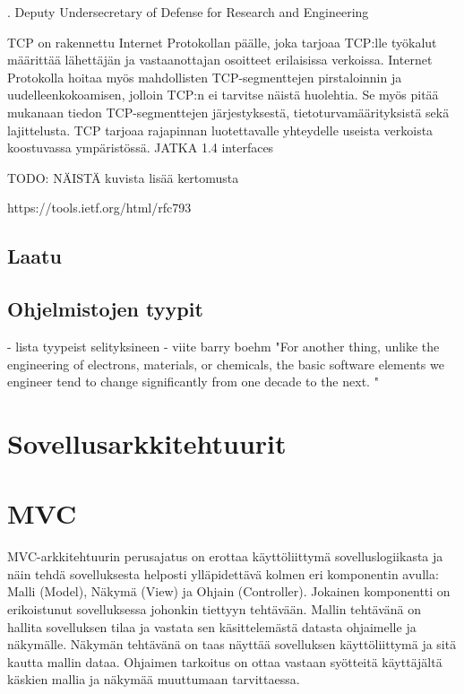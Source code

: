 \documentclass[utf8]{gradu3}
\begin{document}
  \cite{tcp}. 
  Deputy Undersecretary of Defense for Research and Engineering

TCP on rakennettu Internet Protokollan päälle, joka tarjoaa TCP:lle työkalut määrittää lähettäjän ja vastaanottajan osoitteet erilaisissa verkoissa. Internet Protokolla hoitaa myös mahdollisten TCP-segmenttejen pirstaloinnin ja uudelleenkokoamisen, jolloin TCP:n ei tarvitse näistä huolehtia. Se myös pitää mukanaan tiedon TCP-segmenttejen järjestyksestä, tietoturvamäärityksistä sekä lajittelusta. TCP tarjoaa rajapinnan luotettavalle yhteydelle useista verkoista koostuvassa ympäristössä.  JATKA 1.4  interfaces


 TODO: NÄISTÄ kuvista lisää kertomusta

https://tools.ietf.org/html/rfc793



\section{Laatu}

\section{Ohjelmistojen tyypit}
- lista tyypeist selityksineen
- viite barry boehm "For another thing, unlike the engineering of electrons, materials, or chemicals, the basic software elements we engineer tend to change significantly from one decade to the next. "

\chapter{Sovellusarkkitehtuurit}
\chapter{MVC}
MVC-arkkitehtuurin perusajatus on erottaa käyttöliittymä sovelluslogiikasta ja
näin tehdä sovelluksesta helposti ylläpidettävä kolmen eri komponentin avulla:
Malli (Model), Näkymä (View) ja Ohjain (Controller). Jokainen komponentti on
erikoistunut sovelluksessa johonkin tiettyyn tehtävään. Mallin tehtävänä on
hallita sovelluksen tilaa ja vastata sen käsittelemästä datasta ohjaimelle ja näkymälle.
Näkymän tehtävänä on taas näyttää sovelluksen käyttöliittymä ja sitä kautta mallin dataa. 
Ohjaimen tarkoitus on ottaa vastaan syötteitä käyttäjältä käskien mallia ja näkymää muuttumaan tarvittaessa.
\end{document}
